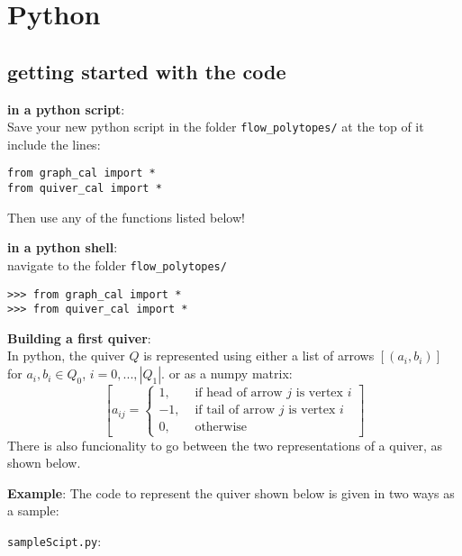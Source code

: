 \documentclass{article}
\begin{document}
\section{Python}
\subsection{getting started with the code}
\noindent\textbf{in a python script}:\\
Save your new python script in the folder \verb|flow_polytopes/|
at the top of it include the lines: 
\begin{Verbatim}
from graph_cal import *
from quiver_cal import *
\end{Verbatim}
Then use any of the functions listed below!
\vspace{.75cm}

\noindent\textbf{in a python shell}:\\
navigate to the folder \verb|flow_polytopes/|
\begin{Verbatim}
>>> from graph_cal import *
>>> from quiver_cal import *
\end{Verbatim}

\noindent\textbf{Building a first quiver}:\\
In python, the quiver $Q$ is represented using either a list of arrows 
$[(a_i, b_i)]$ for $a_i, b_i\in Q_0$, $i = 0, ..., |Q_1|$. 
or as a numpy matrix: 
$$\left[
a_{ij}=\begin{cases}
1,&\text{ if head of arrow }j\text{ is vertex }i\\
-1,&\text{ if tail of arrow }j\text{ is vertex }i\\
0,&\text{ otherwise }
\end{cases}
\right]$$
There is also funcionality to go between the two representations of a quiver, as shown below. 

\noindent\textbf{Example}: 
The code to represent the quiver shown below is given in two ways as a sample:\\
\vspace{.1cm}

\noindent\verb|sampleScipt.py|:\\
\vspace{.1cm}
\end{document}
